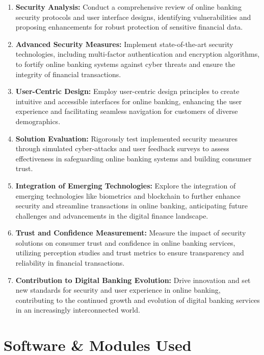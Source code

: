 \documentclass[12pt,a4paper]{report}
\begin{document}
\begin{enumerate}
    \item \textbf{Security Analysis:} Conduct a comprehensive review of online banking security
    protocols and user interface designs, identifying vulnerabilities and proposing
    enhancements for robust protection of sensitive financial data.

    \item \textbf{Advanced Security Measures:} Implement state-of-the-art security technologies,
    including multi-factor authentication and encryption algorithms, to fortify online
    banking systems against cyber threats and ensure the integrity of financial
    transactions.

    \item \textbf{User-Centric Design:} Employ user-centric design principles to create intuitive
    and accessible interfaces for online banking, enhancing the user experience and
    facilitating seamless navigation for customers of diverse demographics.

    \item \textbf{Solution Evaluation:} Rigorously test implemented security measures through
    simulated cyber-attacks and user feedback surveys to assess effectiveness in
    safeguarding online banking systems and building consumer trust.

    \item \textbf{Integration of Emerging Technologies:} Explore the integration of emerging
    technologies like biometrics and blockchain to further enhance security and
    streamline transactions in online banking, anticipating future challenges and
    advancements in the digital finance landscape.

    \item \textbf{Trust and Confidence Measurement:} Measure the impact of security solutions
    on consumer trust and confidence in online banking services, utilizing perception
    studies and trust metrics to ensure transparency and reliability in financial
    transactions.

    \item \textbf{Contribution to Digital Banking Evolution:} Drive innovation and set new
    standards for security and user experience in online banking, contributing to the
    continued growth and evolution of digital banking services in an increasingly
    interconnected world.
\end{enumerate}

\chapter{Software \& Modules Used}
\end{document}
